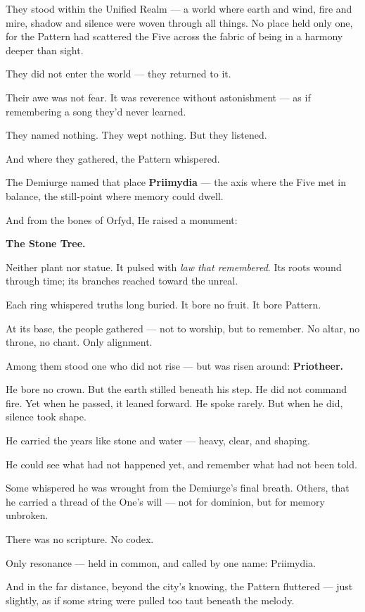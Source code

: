 \documentclass[12pt]{article}
\begin{document}
They stood within the Unified Realm —  
a world where earth and wind, fire and mire, shadow and silence  
were woven through all things.  
No place held only one,  
for the Pattern had scattered the Five across the fabric of being  
in a harmony deeper than sight.

They did not enter the world — they returned to it.

Their awe was not fear.  
It was reverence without astonishment —  
as if remembering a song they’d never learned.

They named nothing.  
They wept nothing.  
But they listened.

And where they gathered, the Pattern whispered.

The Demiurge named that place \textbf{Priimydia} ---  
the axis where the Five met in balance,  
the still-point where memory could dwell.

And from the bones of Orfyd, He raised a monument:

\textbf{The Stone Tree.}

Neither plant nor statue.  
It pulsed with \textit{law that remembered}.  
Its roots wound through time;  
its branches reached toward the unreal.

Each ring whispered truths long buried.  
It bore no fruit.  
It bore Pattern.

At its base, the people gathered — not to worship, but to remember.  
No altar, no throne, no chant.  
Only alignment.

Among them stood one who did not rise — but was risen around:  
\textbf{Priotheer.}

He bore no crown. But the earth stilled beneath his step.  
He did not command fire. Yet when he passed, it leaned forward.  
He spoke rarely. But when he did, silence took shape.

He carried the years like stone and water ---  
heavy, clear, and shaping.

He could see what had not happened yet,  
and remember what had not been told.

Some whispered he was wrought from the Demiurge’s final breath.  
Others, that he carried a thread of the One’s will —  
not for dominion, but for memory unbroken.

There was no scripture.  
No codex.

Only resonance --- held in common,  
and called by one name: Priimydia.

And in the far distance,  
beyond the city’s knowing,  
the Pattern fluttered ---  
just slightly,  
as if some string were pulled too taut beneath the melody.
\end{document}
